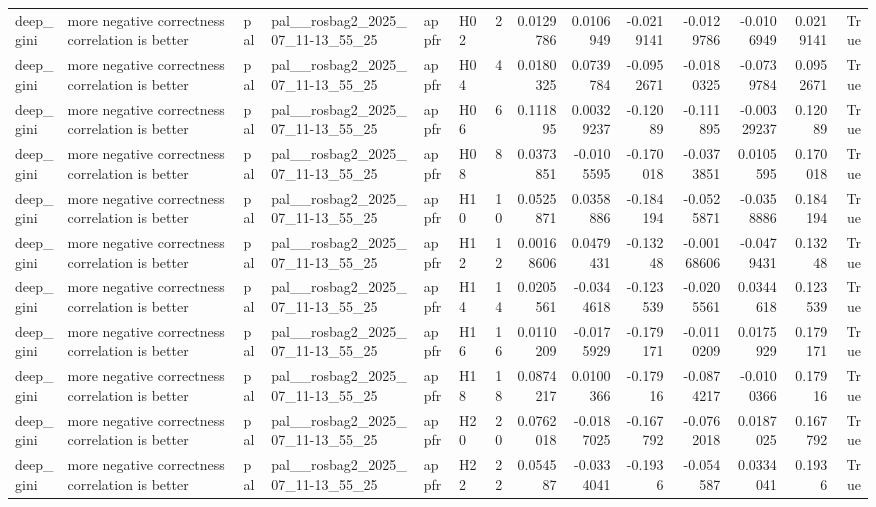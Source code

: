 \begin{longtable}{llllllrrrrrrrr}
deep\_gini & more negative correctness correlation is better & pal & pal\_\_rosbag2\_2025\_07\_11-13\_55\_25 & appfr & H02 & 2 & 0.0129786 & 0.0106949 & -0.0219141 & -0.0129786 & -0.0106949 & 0.0219141 & True \\
deep\_gini & more negative correctness correlation is better & pal & pal\_\_rosbag2\_2025\_07\_11-13\_55\_25 & appfr & H04 & 4 & 0.0180325 & 0.0739784 & -0.0952671 & -0.0180325 & -0.0739784 & 0.0952671 & True \\
deep\_gini & more negative correctness correlation is better & pal & pal\_\_rosbag2\_2025\_07\_11-13\_55\_25 & appfr & H06 & 6 & 0.111895 & 0.00329237 & -0.12089 & -0.111895 & -0.00329237 & 0.12089 & True \\
deep\_gini & more negative correctness correlation is better & pal & pal\_\_rosbag2\_2025\_07\_11-13\_55\_25 & appfr & H08 & 8 & 0.0373851 & -0.0105595 & -0.170018 & -0.0373851 & 0.0105595 & 0.170018 & True \\
deep\_gini & more negative correctness correlation is better & pal & pal\_\_rosbag2\_2025\_07\_11-13\_55\_25 & appfr & H10 & 10 & 0.0525871 & 0.0358886 & -0.184194 & -0.0525871 & -0.0358886 & 0.184194 & True \\
deep\_gini & more negative correctness correlation is better & pal & pal\_\_rosbag2\_2025\_07\_11-13\_55\_25 & appfr & H12 & 12 & 0.00168606 & 0.0479431 & -0.13248 & -0.00168606 & -0.0479431 & 0.13248 & True \\
deep\_gini & more negative correctness correlation is better & pal & pal\_\_rosbag2\_2025\_07\_11-13\_55\_25 & appfr & H14 & 14 & 0.0205561 & -0.0344618 & -0.123539 & -0.0205561 & 0.0344618 & 0.123539 & True \\
deep\_gini & more negative correctness correlation is better & pal & pal\_\_rosbag2\_2025\_07\_11-13\_55\_25 & appfr & H16 & 16 & 0.0110209 & -0.0175929 & -0.179171 & -0.0110209 & 0.0175929 & 0.179171 & True \\
deep\_gini & more negative correctness correlation is better & pal & pal\_\_rosbag2\_2025\_07\_11-13\_55\_25 & appfr & H18 & 18 & 0.0874217 & 0.0100366 & -0.17916 & -0.0874217 & -0.0100366 & 0.17916 & True \\
deep\_gini & more negative correctness correlation is better & pal & pal\_\_rosbag2\_2025\_07\_11-13\_55\_25 & appfr & H20 & 20 & 0.0762018 & -0.0187025 & -0.167792 & -0.0762018 & 0.0187025 & 0.167792 & True \\
deep\_gini & more negative correctness correlation is better & pal & pal\_\_rosbag2\_2025\_07\_11-13\_55\_25 & appfr & H22 & 22 & 0.054587 & -0.0334041 & -0.1936 & -0.054587 & 0.0334041 & 0.1936 & True \\

\end{longtable}

